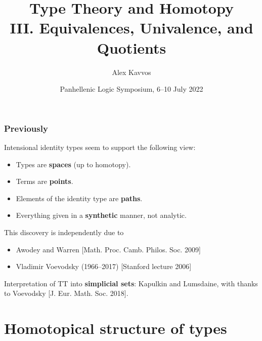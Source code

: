 \documentclass[handout]{beamer} %
\title{Type Theory and Homotopy \\ III. Equivalences, Univalence, and Quotients}
\author{
		Alex Kavvos %
}
\date{Panhellenic Logic Symposium, 6--10 July 2022}
\begin{document}
\frame{\titlepage}

\begin{frame}
  \frametitle{Previously}

  Intensional identity types seem to support the following view:
  \begin{itemize}
    \item Types are \textbf{spaces} (up to homotopy).
    \item Terms are \textbf{points}.
    \item Elements of the identity type are \textbf{paths}.
    \item Everything given in a \textbf{synthetic} manner, not analytic.
  \end{itemize}
  
  This discovery is independently due to 
  \begin{itemize}
    \item Awodey and Warren [Math. Proc. Camb. Philos. Soc. 2009]
    \item Vladimir Voevodsky (1966--2017) [Stanford lecture 2006]
  \end{itemize}
  
  Interpretation of TT into \textbf{simplicial sets}: Kapulkin and Lumsdaine,
  with thanks to Voevodsky [J. Eur. Math. Soc. 2018].
  
  \medskip
  
\end{frame}




\section{Homotopical structure of types}
\end{document}
